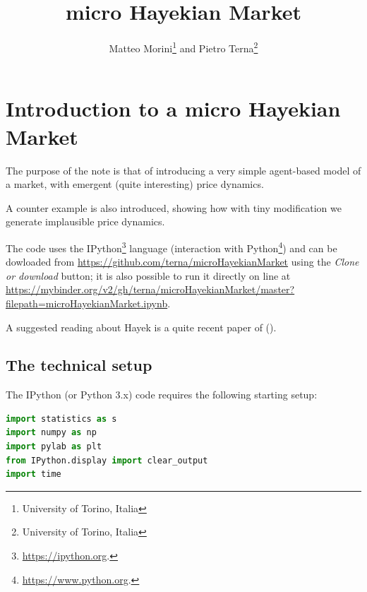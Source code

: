 \documentclass[12pt]{report}
\title{micro Hayekian Market}
\author{Matteo Morini\footnote{University of Torino, Italia} and Pietro Terna\footnote{University of Torino, Italia}}
\begin{document}
\maketitle
\thispagestyle{fancy}

\tableofcontents
\thispagestyle{fancy}

\listoffigures
\thispagestyle{fancy}


\chapter*{Introduction to a micro Hayekian Market}
\label{micro Hayekian Market}
\thispagestyle{fancy}
%


The purpose of the note is that of introducing a very simple agent-based model of a market, with emergent (quite interesting)  price dynamics.

 A counter example is also introduced, showing how with tiny modification we generate implausible price dynamics.

The code uses the IPython\footnote{\url{https://ipython.org}.} language (interaction with Python\footnote{\url{https://www.python.org}.}) and can be dowloaded from \url{https://github.com/terna/microHayekianMarket} using the \emph{Clone or download} button; it is also possible to run it directly on line at \\\url{https://mybinder.org/v2/gh/terna/microHayekianMarket/master?filepath=microHayekianMarket.ipynb}.

A suggested reading about Hayek is a quite recent paper of \citeauthor{10.1257/jep.31.3.215} (\citeyear{10.1257/jep.31.3.215}).


\section{The technical setup}\label{The technical setup}

The IPython (or Python 3.x) code requires the following starting setup:

\begin{lstlisting}[language=Python, caption=Setup of the program, basicstyle=\ttfamily\footnotesize]
%pylab inline
import statistics as s
import numpy as np
import pylab as plt
from IPython.display import clear_output
import time
\end{lstlisting}
\end{document}
